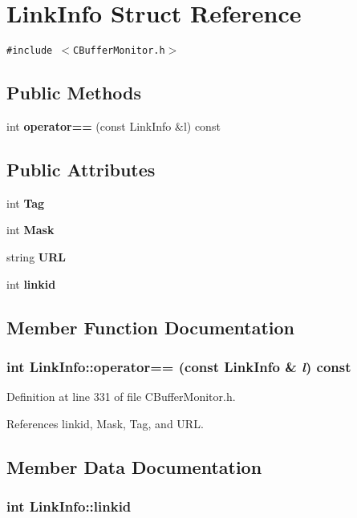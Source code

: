 \section{Link\-Info  Struct Reference}
\label{structLinkInfo}
{\tt \#include $<$CBuffer\-Monitor.h$>$}

\subsection*{Public Methods}
\begin{CompactItemize}
\item 
int {\bf operator==} (const Link\-Info \&l) const
\end{CompactItemize}
\subsection*{Public Attributes}
\begin{CompactItemize}
\item 
int {\bf Tag}
\item 
int {\bf Mask}
\item 
string {\bf URL}
\item 
int {\bf linkid}
\end{CompactItemize}


\subsection{Member Function Documentation}
\subsubsection{\setlength{\rightskip}{0pt plus 5cm}int Link\-Info::operator== (const Link\-Info \& {\em l}) const\hspace{0.3cm}{\tt  [inline]}}\label{structLinkInfo_a0}




Definition at line 331 of file CBuffer\-Monitor.h.

References linkid, Mask, Tag, and URL.

\subsection{Member Data Documentation}
\subsubsection{\setlength{\rightskip}{0pt plus 5cm}int Link\-Info::linkid}\label{structLinkInfo_m3}




